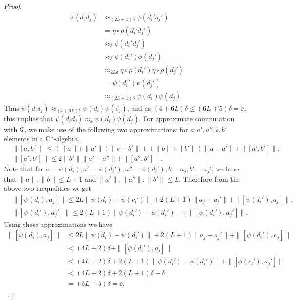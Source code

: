 \documentclass[12pt]{amsart}
\begin{document}
\begin{prop}
\begin{proof}
\begin{equation}
\begin{split}
        \psi(d_id_j) &\approx_{(2L+1)\delta}\psi(d_i'd_j') \\
                     &= \eta \circ \rho(d_i'd_j') \\
                     &\approx_\delta \phi(d_i'd_j') \\
                     &\approx_\delta \phi(d_i')\phi(d_j') \\
                     &\approx_{2L\delta} \eta \circ \rho(d_i')\eta \circ \rho(d_j') \\
                     &= \psi(d_i')\psi(d_j') \\
                     &\approx_{(2L+1)\delta}\psi(d_i)\psi(d_j).
\end{split}
\end{equation}
      Thus $\psi(d_id_j) \approx_{(4+6L)\delta} \psi(d_i)\psi(d_j)$, and as $(4 + 6L)\delta \leq (6L + 5)\delta = \ee$, this implies that $\psi(d_id_j) \approx_\ee \psi(d_i)\psi(d_j)$. For approximate commutation with $\mathcal{G}$, we make use of the following two approximations: for $a,a',a'',b,b'$ elements in a C*-algebra,
      \begin{equation}
      \begin{split}
      &\|[a,b]\|  \leq (\|a\| + \|a'\|)\|b - b'\| + (\|b\| + \|b'\|)\|a - a'\| + \|[a',b']\|, \\
      &\|[a',b']\| \leq 2\|b'\|\|a' - a''\| + \|[a'',b']\|.
      \end{split}
      \end{equation}
        Note that for $a = \psi(d_i),a' = \psi(d_i'),a'' = \phi(d_i'), b = a_j, b' = a_j'$, we have that $\|a\|,\|b\| \leq L + 1$ and $\|a'\|,\|a''\|,\|b'\| \leq L$. Therefore from the above two inequalities we get
      \begin{equation}
      \begin{split}
      &\|[\psi(d_i),a_j]\| \leq 2L\|\psi(d_i) - \psi(c_i')\|+ 2(L+1)\|a_j - a_j'\| + \|[\psi(d_i'),a_j]\|; \\
      &\|[\psi(d_i'),a_j']\| \leq 2(L+1)\|\psi(d_i') - \phi(d_i')\| + \|[\phi(d_i'),a_j']\|.
      \end{split}
      \end{equation}
          Using these approximations we have
\begin{equation}
\begin{split}
              \|[\psi(d_i),a_j]\| &\leq 2L\|\psi(d_i) - \psi(d_i')\| + 2(L+1)\|a_j - a_j'\| + \|[\psi(d_i'),a_j]\| \\
                                &< (4L+2)\delta + \|[\psi(d_i'),a_j]\| \\
                                &\leq (4L+2)\delta + 2(L+1)\|\psi(d_i') - \phi(d_i')\| + \|[\phi(c_i'),a_j']\| \\
                                &< (4L+2)\delta + 2(L+1)\delta + \delta \\
                                &= (6L+5)\delta = \ee.
\end{split}
\end{equation}
  \end{proof}
    \end{prop}
\end{document}

